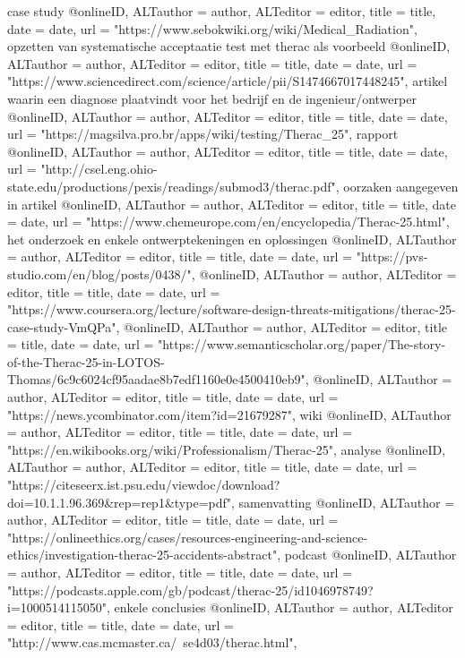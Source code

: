 {{{case study
@online{ID,	ALTauthor = {author},	ALTeditor = {editor},	title = {title},	date = {date},	url = {"https://www.sebokwiki.org/wiki/Medical_Radiation"},}
opzetten van systematische acceptaatie test met therac als voorbeeld
@online{ID,	ALTauthor = {author},	ALTeditor = {editor},	title = {title},	date = {date},	url = {"https://www.sciencedirect.com/science/article/pii/S1474667017448245"},}
artikel waarin een diagnose plaatvindt voor het bedrijf en de ingenieur/ontwerper
@online{ID,	ALTauthor = {author},	ALTeditor = {editor},	title = {title},	date = {date},	url = {"https://magsilva.pro.br/apps/wiki/testing/Therac_25"},}
rapport
@online{ID,	ALTauthor = {author},	ALTeditor = {editor},	title = {title},	date = {date},	url = {"http://csel.eng.ohio-state.edu/productions/pexis/readings/submod3/therac.pdf"},}
oorzaken aangegeven in artikel
@online{ID,	ALTauthor = {author},	ALTeditor = {editor},	title = {title},	date = {date},	url = {"https://www.chemeurope.com/en/encyclopedia/Therac-25.html"},}
het onderzoek en enkele ontwerptekeningen en oplossingen
@online{ID,	ALTauthor = {author},	ALTeditor = {editor},	title = {title},	date = {date},	url = {"https://pvs-studio.com/en/blog/posts/0438/"},}
@online{ID,	ALTauthor = {author},	ALTeditor = {editor},	title = {title},	date = {date},	url = {"https://www.coursera.org/lecture/software-design-threats-mitigations/therac-25-case-study-VmQPa"},}
@online{ID,	ALTauthor = {author},	ALTeditor = {editor},	title = {title},	date = {date},	url = {"https://www.semanticscholar.org/paper/The-story-of-the-Therac-25-in-LOTOS-Thomas/6c9c6024cf95aadae8b7edf1160e0e4500410eb9"},}
@online{ID,	ALTauthor = {author},	ALTeditor = {editor},	title = {title},	date = {date},	url = {"https://news.ycombinator.com/item?id=21679287"},}
wiki
@online{ID,	ALTauthor = {author},	ALTeditor = {editor},	title = {title},	date = {date},	url = {"https://en.wikibooks.org/wiki/Professionalism/Therac-25"},}
analyse
@online{ID,	ALTauthor = {author},	ALTeditor = {editor},	title = {title},	date = {date},	url = {"https://citeseerx.ist.psu.edu/viewdoc/download?doi=10.1.1.96.369&rep=rep1&type=pdf"},}
samenvatting
@online{ID,	ALTauthor = {author},	ALTeditor = {editor},	title = {title},	date = {date},	url = {"https://onlineethics.org/cases/resources-engineering-and-science-ethics/investigation-therac-25-accidents-abstract"},}
podcast
@online{ID,	ALTauthor = {author},	ALTeditor = {editor},	title = {title},	date = {date},	url = {"https://podcasts.apple.com/gb/podcast/therac-25/id1046978749?i=1000514115050"},}
enkele conclusies
@online{ID,	ALTauthor = {author},	ALTeditor = {editor},	title = {title},	date = {date},	url = {"http://www.cas.mcmaster.ca/~se4d03/therac.html"},}
}}}
